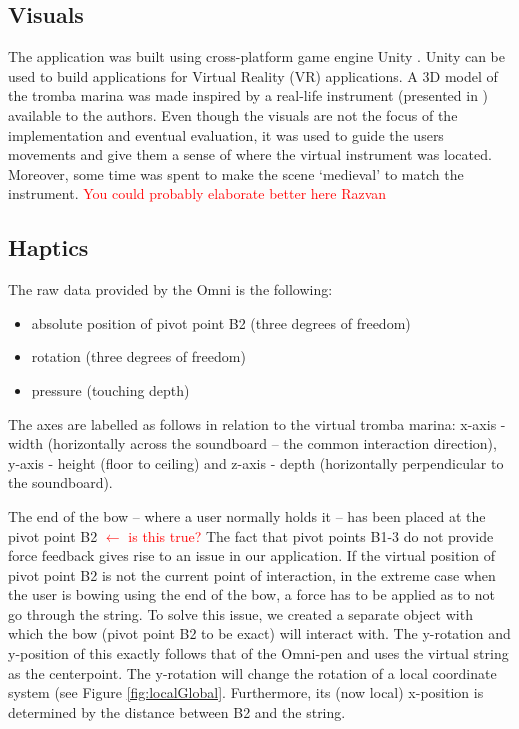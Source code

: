 \documentclass[dvipsnames, pdftex]{article}
\def\SWcomment[#1]{\textcolor{Red}{#1}}
\begin{document}
\subsection{Visuals}
The application was built using cross-platform game engine Unity \cite{unity}. Unity can be used to build applications for Virtual Reality (VR) applications. A 3D model of the tromba marina was made inspired by a real-life instrument (presented in \cite{Baldwin2016}) available to the authors. Even though the visuals are not the focus of the implementation and eventual evaluation, it was used to guide the users movements and give them a sense of where the virtual instrument was located. Moreover, some time was spent to make the scene `medieval' to match the instrument. \SWcomment[You could probably elaborate better here Razvan]

\subsection{Haptics}
The raw data provided by the Omni is the following:
\begin{itemize}
    \item absolute position of pivot point B2 (three degrees of freedom)
    \item rotation (three degrees of freedom)
    \item pressure (touching depth)
\end{itemize}
%
The axes are labelled as follows in relation to the virtual tromba marina: x-axis - width (horizontally across the soundboard -- the common interaction direction), y-axis - height (floor to ceiling) and z-axis - depth (horizontally perpendicular to the soundboard).


The end of the bow -- where a user normally holds it -- has been placed at the pivot point B2 \SWcomment[$\leftarrow$ is this true?]
The fact that pivot points B1-3 do not provide force feedback gives rise to an issue in our application. If the virtual
position of pivot point B2 is not the current point of interaction, in the extreme case when the user is bowing using the end of the bow, a force has to be applied as to not go through the string. To solve this issue, we created a separate object with which the bow (pivot point B2 to be exact) will interact with. The y-rotation and y-position of this exactly follows that of the Omni-pen and uses the virtual string as the centerpoint. The y-rotation will change the rotation of a local coordinate system (see Figure \ref{fig:localGlobal}. Furthermore, its (now local) x-position is determined by the distance between B2 and the string. 
\end{document}

